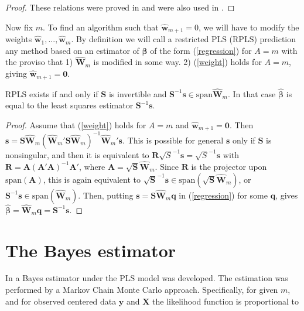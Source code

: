 \documentclass[num-refs]{wiley-article}
\begin{document}
\begin{proof}
  These relations were proved in \citet{helland1988structure} and were also used in \citet{cook2013envelopes}.
\end{proof}

Now fix $m$. To find an algorithm such that $\widehat{\bm{w}}_{m+1}=0$, we will have to modify the weights $\widehat{\bm{w}}_1,...,\widehat{\bm{w}}_m$. By definition we will call a restricted PLS (RPLS) prediction any method based on an estimator of $\bm{\beta}$ of the form (\ref{regression}) for $A=m$ with the proviso that 1) $\widehat{\bm{W}}_{m}$ is modified in some way.  2) (\ref{weight}) holds for $A=m$, giving $\widehat{\bm{w}}_{m+1}=\bm{0}$.

\begin{theorem}
  RPLS exists if and only if $\bm{S}$ is invertible and $\bm{S}^{-1}\bm{s}\in\mathrm{span}\widehat{\bm{W}}_{m}$. In that case $\widehat{\bm{\beta}}$ is equal to the least squares estimator $\bm{S}^{-1}\bm{s}$.
\end{theorem}

\begin{proof}
  Assume that (\ref{weight}) holds for $A=m$ and $\widehat{\bm{w}}_{m+1}=\bm{0}$. Then $\bm{s}=\bm{S}\widehat{\bm{W}}_m(\widehat{\bm{W}}_m'\bm{S}\widehat{\bm{W}}_m)^{-1}\widehat{\bm{W}}_m'\bm{s}$. This is possible for general $\bm{s}$ only if $\bm{S}$ is nonsingular, and then it is equivalent to $\bm{R}\sqrt{S}^{-1}\bm{s}=\sqrt{S}^{-1}\bm{s}$ with $\bm{R}=\bm{A}(\bm{A}'\bm{A})^{-1}\bm{A}'$, where $\bm{A}=\sqrt{\bm{S}}\widehat{\bm{W}}_m$. Since $\bm{R}$ is the projector upon $\mathrm{span}(\bm{A})$, this is again equivalent to $\sqrt{\bm{S}}^{-1}\bm{s}\in\mathrm{span}(\sqrt{\bm{S}}\widehat{\bm{W}}_m)$, or $\bm{S}^{-1}\bm{s}\in\mathrm{span}(\widehat{\bm{W}}_m)$. Then, putting $\bm{s}=\bm{S}\widehat{\bm{W}}_m\bm{q}$ in (\ref{regression}) for some $\bm{q}$, gives $\widehat{\bm{\beta}}=\widehat{\bm{W}}_m\bm{q}=\bm{S}^{-1}\bm{s}$.
\end{proof}

\section{The Bayes estimator}
In \citet{helland2012near} a Bayes estimator under the PLS model was developed. The estimation was performed by a Markov Chain Monte Carlo approach. Specifically, for given $m$, and for observed centered data $\bm{y}$ and $\bm{X}$ the likelihood function is proportional to
\end{document}

